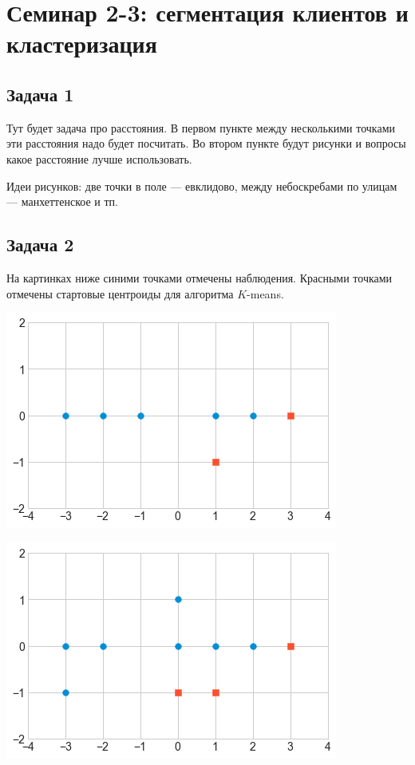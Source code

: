 \documentclass[12pt, a4paper, oneside]{article}
\begin{document}
\section*{Семинар 2-3:  сегментация клиентов и кластеризация}




\subsection*{Задача 1 }

Тут будет задача про расстояния. В первом пункте между несколькими точками эти расстояния надо будет посчитать. Во втором пункте будут рисунки и вопросы какое расстояние лучше использовать. 

Идеи рисунков: две точки в поле --- евклидово, между небоскребами по улицам --- манхеттенское и тп. 


\subsection*{Задача 2}

На картинках ниже синими точками отмечены наблюдения. Красными точками отмечены стартовые центроиды для алгоритма $K$-means. 

\begin{minipage}[t]{0.45\textwidth}
\includegraphics[scale=0.5]{knn1.png}
\end{minipage}
\hfill
\begin{minipage}[t]{0.45\textwidth}
\includegraphics[scale=0.5]{knn2.png}
\end{minipage}
\end{document}
